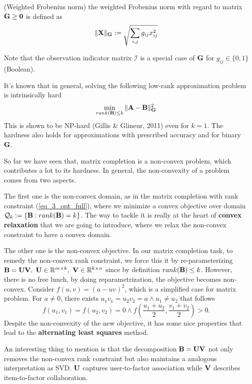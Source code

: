 \documentclass[../book-template.tex]{subfiles}
\begin{document}
\begin{definition}\label{def_3_wtd_f_norm}
	(Weighted Frobenius norm) the weighted Frobenius norm with regard to matrix ${\bf G}\geq {\bf 0}$ is defined as
	\begin{equation*}
	\|{\bf X}\|_{{\bf G}}:=\sqrt{\sum_{i,j}g_{ij}x_{ij}^2}
	\end{equation*}
\end{definition}
Note that the observation indicator matrix $\mathcal{I}$ is a special case of ${\bf G}$ for $g_{ij}\in\{0,1\}$ (Boolean).
\par It's known that in general, solving the following low-rank approximation problem is intrinsically hard
\begin{equation*}
	\min_{rank({\bf B})\leq k} \|{\bf A}-{\bf B}\|_{{\bf G}}^2
\end{equation*}
This is shown to be NP-hard (Gillis \& Glineur, 2011) even for $k=1$. The hardness also holds for approximations with prescribed accuracy and for binary ${\bf G}$.
\par So far we have seen that, matrix completion is a non-convex problem, which contributes a lot to its hardness. In general, the non-convexity of a problem comes from two aspects. 
\par The first one is the non-convex domain, as in the matrix completion with rank constraint (\ref{eq_3_opt_full}), where we minimize a convex objective over domain $\mathcal{Q}_k:=\{{\bf B}:rank({\bf B})=k\}$. The way to tackle it is really at the heart of \textbf{convex relaxation} that we are going to introduce, where we relax the non-convex constraint to have a convex domain.
\par The other one is the non-convex objective. In our matrix completion task, to remedy the non-convex rank constraint, we force this it by re-parameterizing ${\bf B}={\bf UV},\ {\bf U}\in \mathbb{R}^{m\times k},\ {\bf V}\in \mathbb{R}^{k\times n}$ since by definition $rank({\bf B})\leq k$. However, there is no free lunch, by doing reparametrization, the objective becomes non-convex. Consider $f(u, v) = (a-uv)^2$, which is a simplified case for matrix problem. For $a\neq 0$, there exists $u_1v_1=u_2v_2=a \land u_1\neq u_2$ that follows
\begin{equation*}
	f(u_1,v_1)=f(u_2,v_2)=0\land f(\frac{u_1+u_2}{2},\frac{v_1+v_2}{2})>0.
\end{equation*}
Despite the non-convexity of the new objective, it has some nice properties that lead to the \textbf{alternating least squares} method.
\begin{remark}
	An interesting thing to mention is that the decomposition ${\bf B} = {\bf UV}$ not only removes the non-convex rank constraint but also maintains a analogous interpretation as SVD. ${\bf U}$ captures user-to-factor association while ${\bf V}$ describes item-to-factor collaboration.
\end{remark}
\end{document}
